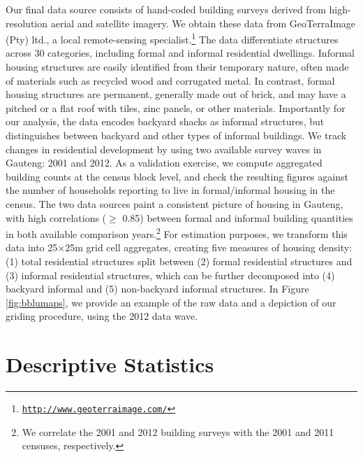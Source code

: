 \documentclass[12pt]{article}
\begin{document}

Our final data source consists of hand-coded building surveys derived from high-resolution aerial and satellite imagery. We obtain these data from GeoTerraImage (Pty) ltd., a local remote-sensing specialist.\footnote{\href{http://www.geoterraimage.com/}{\tt http://www.geoterraimage.com/}} The data differentiate structures across 30 categories, including formal and informal residential dwellings. Informal housing structures are easily identified from their temporary nature, often made of materials such as recycled wood and corrugated metal. In contrast, formal housing structures are permanent, generally made out of brick, and may have a pitched or a flat roof with tiles, zinc panels, or other materials. Importantly for our analysis, the data encodes backyard shacks as informal structures, but distinguishes between backyard and other types of informal buildings. We track changes in residential development by using two available survey waves in Gauteng: 2001 and 2012. As a validation exercise, we compute aggregated building counts at the census block level, and check the resulting figures against the number of households reporting to live in formal/informal housing in the census. The two data sources paint a consistent picture of housing in Gauteng, with high correlations ($\geq$ 0.85) between formal and informal building quantities in both available comparison years.\footnote{We correlate the 2001 and 2012 building surveys with the 2001 and 2011 censuses, respectively.} For estimation purposes, we transform this data into 25$\times$25m grid cell aggregates, creating five measures of housing density: (1) total residential structures split between (2) formal residential structures and (3) informal residential structures, which can be further decomposed into (4) backyard informal and (5) non-backyard informal structures.  In Figure \ref{fig:bblumaps}, we provide an example of the raw data and a depiction of our griding procedure, using the 2012 data wave.



\section{Descriptive Statistics}\label{section:descriptives}
\end{document}
